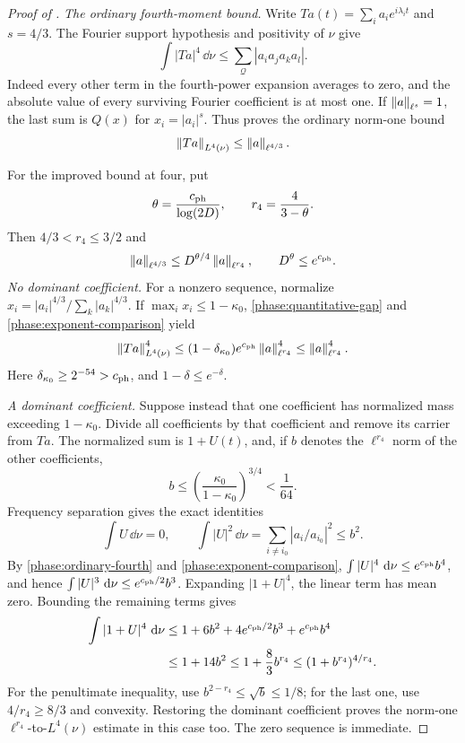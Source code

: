 \begin{proof}[Proof of ]
\emph{The ordinary fourth-moment bound.}
Write \(Ta(t)=\sum_i a_i e^{i\lambda_i t}\) and \(s=4/3\).
The Fourier support hypothesis and positivity of \(\nu\) give
\[
 \int |Ta|^4\,\dd\nu
 \le \sum_{\mathcal Q}|a_i a_j a_k a_l|.
\]
Indeed every other term in the fourth-power expansion averages to zero,
and the absolute value of every surviving Fourier coefficient is at most
one.  If \(\left\|a\right\|_{\ell^s}=1\), the last sum is \(Q(x)\) for
\(x_i=|a_i|^s\).  Thus  proves the ordinary
norm-one bound
\begin{equation}
 \left\|Ta\right\|_{L^4(\nu)}\le\left\|a\right\|_{\ell^{4/3}}.
 \label{phase:ordinary-fourth}
\end{equation}

For the improved bound at four, put
\[
 \theta=\frac{c_{\rm ph}}{\log(2D)},
 \qquad r_4=\frac4{3-\theta}.
\]
Then \(4/3<r_4\le3/2\) and
\begin{equation}
 \left\|a\right\|_{\ell^{4/3}}
 \le D^{\theta/4}\left\|a\right\|_{\ell^{r_4}},
 \qquad D^\theta\le e^{c_{\rm ph}}.
 \label{phase:exponent-comparison}
\end{equation}
\emph{No dominant coefficient.}
For a nonzero sequence, normalize \(x_i=|a_i|^{4/3}/
\sum_k|a_k|^{4/3}\).  If \(\max_i x_i\le1-\kappa_0\),
\eqref{phase:quantitative-gap} and
\eqref{phase:exponent-comparison} yield
\[
 \left\|Ta\right\|_{L^4(\nu)}^4
 \le (1-\delta_{\kappa_0})e^{c_{\rm ph}}
                 \left\|a\right\|_{\ell^{r_4}}^4
 \le \left\|a\right\|_{\ell^{r_4}}^4.
\]
Here \(\delta_{\kappa_0}\ge2^{-54}>c_{\rm ph}\), and
\(1-\delta\le e^{-\delta}\).

\emph{A dominant coefficient.}
Suppose instead that one coefficient has normalized mass exceeding
\(1-\kappa_0\).  Divide all coefficients by that coefficient and remove
its carrier from \(Ta\).  The normalized sum is \(1+U(t)\), and, if
\(b\) denotes the \(\ell^{r_4}\) norm of the other coefficients,
\begin{equation}
 b\le\left(\frac{\kappa_0}{1-\kappa_0}\right)^{3/4}<\frac1{64}.
 \label{phase:small-remainder}
\end{equation}
Frequency separation gives the exact identities
\[
 \int U\,\dd\nu=0,
 \qquad
 \int |U|^2\,\dd\nu
      =\sum_{i\ne i_0}|a_i/a_{i_0}|^2\le b^2.
\]
By \eqref{phase:ordinary-fourth} and
\eqref{phase:exponent-comparison},
\(\int|U|^4\,\,\mathrm d\nu\le e^{c_{\rm ph}}b^4\), and hence
\(\int|U|^3\,\,\mathrm d\nu\le e^{c_{\rm ph}/2}b^3\).
Expanding \(|1+U|^4\), the linear term has mean zero.  Bounding the
remaining terms gives
\begin{align*}
 \int|1+U|^4\,\,\mathrm d\nu
 &\le1+6b^2+4e^{c_{\rm ph}/2}b^3+e^{c_{\rm ph}}b^4\\
 &\le1+14b^2
 \le1+\frac83 b^{r_4}
 \le(1+b^{r_4})^{4/r_4}.
\end{align*}
For the penultimate inequality, use
\(b^{2-r_4}\le\sqrt b\le1/8\); for the last one, use
\(4/r_4\ge8/3\) and convexity.  Restoring the dominant coefficient
proves the norm-one \(\ell^{r_4}\)-to-\(L^4(\nu)\) estimate in this
case too.  The zero sequence is immediate.


\end{proof}
